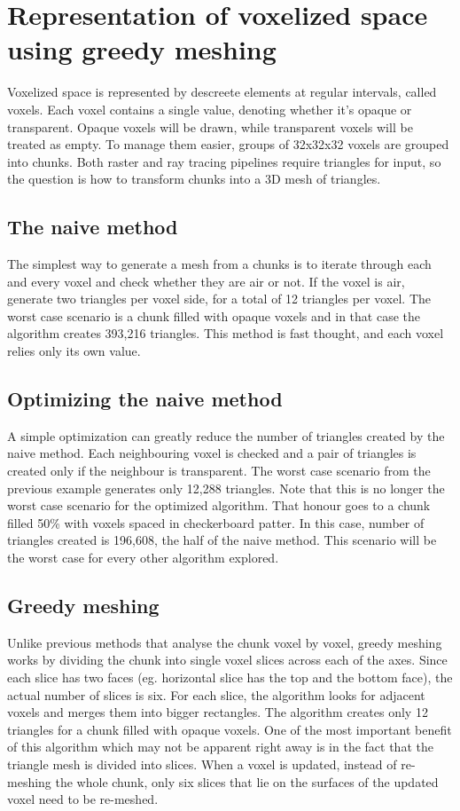 \documentclass[times, utf8, zavrsni, numeric]{fer}
\begin{document}
\chapter{Representation of voxelized space using greedy meshing}
Voxelized space is represented by descreete elements at regular intervals, called voxels. Each voxel contains a single value, denoting whether it's opaque or transparent. Opaque voxels will be drawn, while transparent voxels will be treated as empty. To manage them easier, groups of 32x32x32 voxels are grouped into chunks. Both raster and ray tracing pipelines require triangles for input, so the question is how to transform chunks into a 3D mesh of triangles.

\section{The naive method}
The simplest way to generate a mesh from a chunks is to iterate through each and every voxel and check whether they are air or not. If the voxel is air, generate two triangles per voxel side, for a total of 12 triangles per voxel. The worst case scenario is a chunk filled with opaque voxels and in that case the algorithm creates 393,216 triangles. This method is fast thought, and each voxel relies only its own value.

\section{Optimizing the naive method}
A simple optimization can greatly reduce the number of triangles created by the naive method. Each neighbouring voxel is checked and a pair of triangles is created only if the neighbour is transparent. The worst case scenario from the previous example generates only 12,288 triangles. Note that this is no longer the worst case scenario for the optimized algorithm. That honour goes to a chunk filled 50\% with voxels spaced in checkerboard patter. In this case, number of triangles created is 196,608, the half of the naive method. This scenario will be the worst case for every other algorithm explored.

\section{Greedy meshing}
Unlike previous methods that analyse the chunk voxel by voxel, greedy meshing works by dividing the chunk into single voxel slices across each of the axes. Since each slice has two faces (eg. horizontal slice has the top and the bottom face), the actual number of slices is six.
For each slice, the algorithm looks for adjacent voxels and merges them into bigger rectangles. The algorithm creates only 12 triangles for a chunk filled with opaque voxels. One of the most important benefit of this algorithm which may not be apparent right away is in the fact that the triangle mesh is divided into slices. When a voxel is updated, instead of re-meshing the whole chunk, only six slices that lie on the surfaces of the updated voxel need to be re-meshed.
\end{document}
